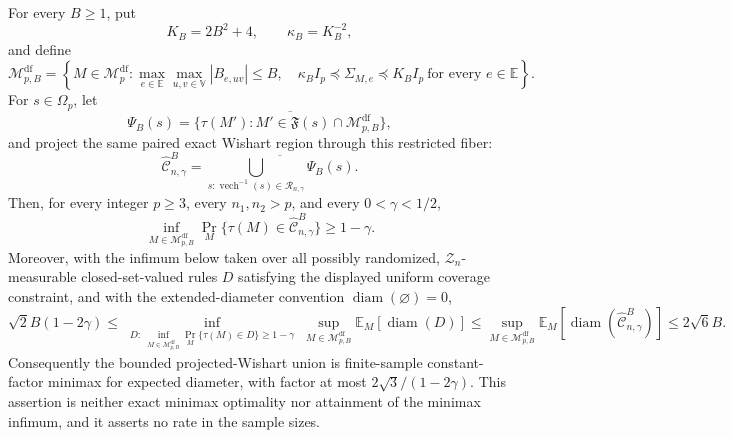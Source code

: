 For every \(B\ge1\), put
\[
K_B=2B^2+4,
\qquad
\kappa_B=K_B^{-2},
\]
and define
\[
\mathcal M_{p,B}^{\mathrm{df}}
=\left\{M\in\mathcal M_p^{\mathrm{df}}:
\max_{e\in\mathbb E}\max_{u,v\in\mathbb V}|B_{e,uv}|\le B,
\quad
\kappa_B I_p\preceq\Sigma_{M,e}\preceq K_BI_p
\ \text{for every }e\in\mathbb E\right\}.
\]
For \(s\in\Omega_p\), let
\[
\Psi_B(s)
=\overline{\{\tau(M'):M'\in\mathfrak F(s)\cap
\mathcal M_{p,B}^{\mathrm{df}}\}},
\]
and project the same paired exact Wishart region through this restricted fiber:
\[
\widehat{\mathcal C}^{B}_{n,\gamma}
=\overline{\bigcup_{s:\operatorname{vech}^{-1}(s)\in
\mathcal R_{n,\gamma}}\Psi_B(s)}.
\]
Then, for every integer \(p\ge3\), every \(n_1,n_2>p\), and every \(0<\gamma<1/2\),
\[
\inf_{M\in\mathcal M_{p,B}^{\mathrm{df}}}
\Pr_M\{\tau(M)\in\widehat{\mathcal C}^{B}_{n,\gamma}\}
\ge1-\gamma.
\]
Moreover, with the infimum below taken over all possibly randomized, \(\mathcal Z_n\)-measurable closed-set-valued rules \(D\) satisfying the displayed uniform coverage constraint, and with the extended-diameter convention \(\operatorname{diam}(\varnothing)=0\),
\[
\sqrt2 B(1-2\gamma)
\le
\inf_{\substack{D:\ 
 \inf_{M\in\mathcal M_{p,B}^{\mathrm{df}}}
 \Pr_M\{\tau(M)\in D\}\ge1-\gamma}}
\sup_{M\in\mathcal M_{p,B}^{\mathrm{df}}}
\mathbb E_M[\operatorname{diam}(D)]
\le
\sup_{M\in\mathcal M_{p,B}^{\mathrm{df}}}
\mathbb E_M[\operatorname{diam}(\widehat{\mathcal C}^{B}_{n,\gamma})]
\le2\sqrt6 B.
\]
Consequently the bounded projected-Wishart union is finite-sample constant-factor minimax for expected diameter, with factor at most \(2\sqrt3/(1-2\gamma)\).  This assertion is neither exact minimax optimality nor attainment of the minimax infimum, and it asserts no rate in the sample sizes.